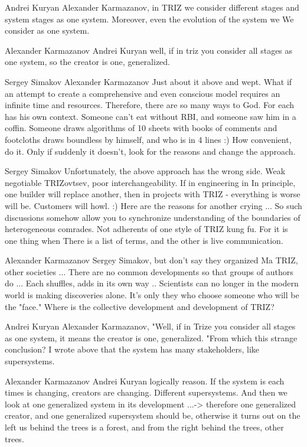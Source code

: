\documentclass[11pt,a4paper]{article}
\begin{document}
Andrei Kuryan Alexander Karmazanov, in TRIZ we consider different stages and
system stages as one system. Moreover, even the evolution of the system we We
consider as one system.

Alexander Karmazanov Andrei Kuryan well, if in triz you consider all stages as
one system, so the creator is one, generalized.

Sergey Simakov Alexander Karmazanov Just about it above and wept. What if an
attempt to create a comprehensive and even conscious model requires an
infinite time and resources. Therefore, there are so many ways to God. For
each has his own context. Someone can’t eat without RBI, and someone saw him
in a coffin. Someone draws algorithms of 10 sheets with books of comments and
footcloths draws boundless by himself, and who is in 4 lines :) How
convenient, do it. Only if suddenly it doesn’t, look for the reasons and
change the approach.

Sergey Simakov Unfortunately, the above approach has the wrong side. Weak
negotiable TRIZovtsev, poor interchangeability. If in engineering in In
principle, one builder will replace another, then in projects with TRIZ -
everything is worse will be. Customers will howl. :) Here are the reasons for
another crying ... So such discussions somehow allow you to synchronize
understanding of the boundaries of heterogeneous comrades. Not adherents of
one style of TRIZ kung fu. For it is one thing when There is a list of terms,
and the other is live communication.

Alexander Karmazanov Sergey Simakov, but don’t say they organized Ma TRIZ,
other societies ... There are no common developments so that groups of authors
do ...  Each shuffles, adds in its own way .. Scientists can no longer in the
modern world is making discoveries alone. It’s only they who choose someone
who will be the "face." Where is the collective development and development of
TRIZ?

Andrei Kuryan Alexander Karmazanov, "Well, if in Trize you consider all stages
as one system, it means the creator is one, generalized. "From which this
strange conclusion? I wrote above that the system has many stakeholders,
like supersystems.

Alexander Karmazanov Andrei Kuryan logically reason. If the system is each
times is changing, creators are changing. Different supersystems. And then we
look at one generalized system in its development ...-> therefore one
generalized creator, and one generalized supersystem should be, otherwise it
turns out on the left us behind the trees is a forest, and from the right
behind the trees, other trees.
\end{document}
